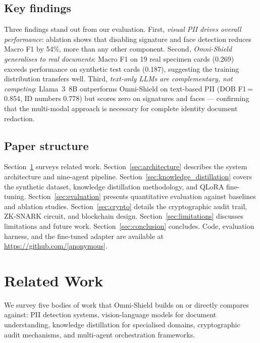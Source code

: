 \documentclass[conference]{IEEEtran}
\begin{document}
\subsection*{Key findings}

Three findings stand out from our evaluation.
First, \emph{visual PII drives overall performance}:
ablation shows that disabling signature and face detection
reduces Macro F1 by 54\%, more than any other component.
Second, \emph{Omni-Shield generalises to real documents}:
Macro F1 on 19 real specimen cards (0.269) exceeds
performance on synthetic test cards (0.187), suggesting
the training distribution transfers well.
Third, \emph{text-only LLMs are complementary, not
competing}: Llama~3~8B outperforms Omni-Shield on
text-based PII (DOB F1\,=\,0.854, ID numbers 0.778)
but scores zero on signatures and faces --- confirming
that the multi-modal approach is necessary for complete
identity document redaction.

\subsection*{Paper structure}

Section~\ref{sec:related} surveys related work.
Section~\ref{sec:architecture} describes the system
architecture and nine-agent pipeline.
Section~\ref{sec:knowledge_distillation} covers the
synthetic dataset, knowledge distillation methodology,
and QLoRA fine-tuning.
Section~\ref{sec:evaluation} presents quantitative
evaluation against baselines and ablation studies.
Section~\ref{sec:crypto} details the cryptographic
audit trail, ZK-SNARK circuit, and blockchain design.
Section~\ref{sec:limitations} discusses limitations
and future work.
Section~\ref{sec:conclusion} concludes.
Code, evaluation harness, and the fine-tuned adapter
are available at \url{https://github.com/[anonymous]}.

\section{Related Work}
\label{sec:related}

We survey five bodies of work that Omni-Shield builds on
or directly compares against: PII detection systems,
vision-language models for document understanding,
knowledge distillation for specialised domains,
cryptographic audit mechanisms, and multi-agent
orchestration frameworks.
\end{document}
